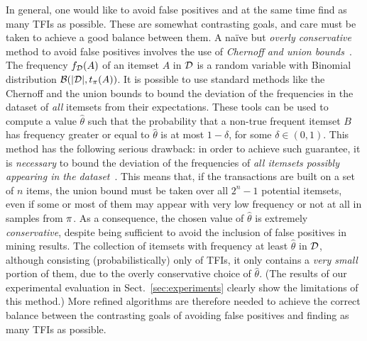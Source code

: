 In general, one would like to avoid false positives and 
at the same time find as many TFIs as possible. These are somewhat contrasting
goals, and care must be taken to achieve a good balance between them.
A na\"ive but \emph{overly conservative} method to avoid false positives
involves the use of \emph{Chernoff and union bounds}~\citep{MitzenmacherU05}.
The frequency $f_{\cal D}(A)$ of an itemset $A$ in ${\cal D}$ is a random variable with
Binomial distribution $\mathcal{B}(|{\cal D}|,t_\pi(A))$. It is possible to use
standard methods like the Chernoff and the union bounds to bound the deviation
of the frequencies in the dataset of \emph{all} itemsets from their
expectations. These tools can be used to compute a value $\hat\theta$ such that
the probability that a non-true frequent itemset $B$ has frequency
greater or equal to $\hat\theta$ is at most $1-\delta$, for some
$\delta\in(0,1)$. This method has the following serious drawback: in order to
achieve such guarantee, it is \emph{necessary} to bound the deviation of the
frequencies of \emph{all itemsets possibly appearing in the dataset}~\citep{KirschMAPUV12}. This means
that, if the transactions are built on a set of $n$ items, the union bound must
be taken over all $2^n-1$ potential itemsets, even if some or most of them may
appear with very low frequency or not at all in samples from $\pi$. As a
consequence, the chosen value of $\hat\theta$ is extremely \emph{conservative}, despite
being sufficient to avoid the inclusion of false positives in mining results.  %
The collection of itemsets with frequency at least $\hat\theta$ in ${\cal D}$,
although consisting (probabilistically) only of TFIs, it only contains a
\emph{very small} portion of them, due to the overly conservative choice of
$\hat\theta$. (The results of our experimental evaluation
in Sect.~\ref{sec:experiments} clearly show the limitations of this method.) More
refined algorithms are therefore needed to achieve the correct balance between
the contrasting goals of avoiding false positives and finding as many TFIs as
possible.


